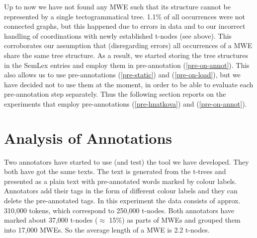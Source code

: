 
Up to now we have not found any MWE such that its structure cannot be represented by a single tectogrammatical tree. 1.1\% of all occurrences were not connected graphs, but this happened due to errors in data and to our incorrect handling of coordinations with newly established t-nodes (see above). This corroborates our assumption that (disregarding errors) all occurrences of a MWE share the same tree structure. As a result, we started storing the tree structures in the SemLex entries and employ them in pre-annotation (\ref{pre-on-annot}). This also allows us to use pre-annotations (\ref{pre-static}) and (\ref{pre-on-load}), but we have decided not to use them at the moment, in order to be able to evaluate each pre-annotation step separately. Thus the following section reports on the experiments that employ pre-annotations (\ref{pre-hnatkova}) and (\ref{pre-on-annot}).


\section{Analysis of Annotations}
\label{sec:analysis}
Two annotators have started to use (and test) the tool we have developed.
They both have got the same texts. The text is generated from the t-trees and presented as a plain text with pre-annotated words mark\-ed by colour labels. Annotators add their tags in the form of different colour labels and they can delete the pre-annotated tags. 
In this experiment the data consists of approx. 310,000 tokens, which correspond to 250,000 t-nodes.
Both annotators have marked about 37,000 t-nodes ($\approx$ 15\%) as parts of MWEs and grouped them into 17,000 MWEs. So the average length of a MWE is 2.2 t-nodes.

